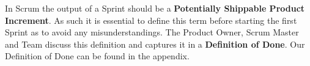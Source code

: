 In Scrum the output of a Sprint should be a \textbf{Potentially Shippable Product Increment}. As such it is essential to define this term before starting the first Sprint as to avoid any misunderstandings. The Product Owner, Scrum Master and Team discuss this definition and captures it in a \textbf{Definition of Done}.
Our Definition of Done can be found in the appendix.